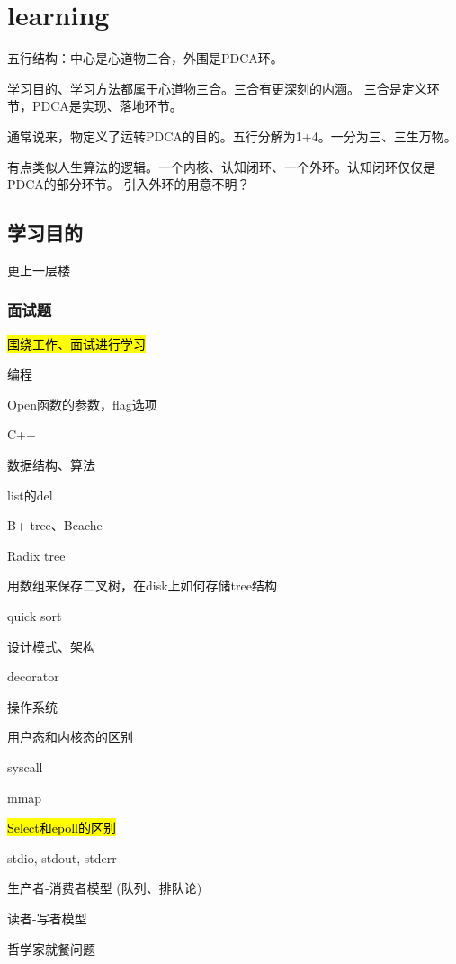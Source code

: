 \chapter{learning}

五行结构：中心是心道物三合，外围是PDCA环。

学习目的、学习方法都属于心道物三合。三合有更深刻的内涵。
三合是定义环节，PDCA是实现、落地环节。

通常说来，物定义了运转PDCA的目的。五行分解为1+4。一分为三、三生万物。

有点类似人生算法的逻辑。一个内核、认知闭环、一个外环。认知闭环仅仅是PDCA的部分环节。
引入外环的用意不明？

\section{学习目的}

更上一层楼

\subsection{面试题}

\hl{围绕工作、面试进行学习}

编程
\begin{enumbox}
\item Open函数的参数，flag选项
\item C++
\end{enumbox}

数据结构、算法
\begin{enumbox}
\item list的del
\item B+ tree、Bcache
\item Radix tree
\item 用数组来保存二叉树，在disk上如何存储tree结构
\item quick sort
\end{enumbox}

设计模式、架构
\begin{enumbox}
\item decorator
\end{enumbox}

操作系统
\begin{enumbox}
\item 用户态和内核态的区别
\item syscall
\item mmap
\item \hl{Select和epoll的区别}
\item stdio, stdout, stderr
\item 生产者-消费者模型 (队列、排队论)
\item 读者-写者模型
\item 哲学家就餐问题
\end{enumbox}

